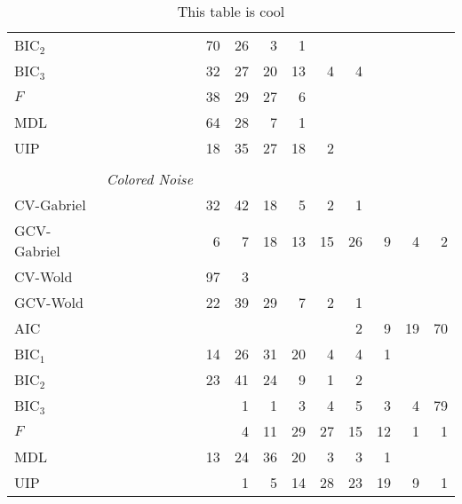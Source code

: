 \begin{table}
\begin{tabular}{lrrrrrrrrrrrrrrrr}
 BIC$_2$ &  &  &  &  &  &  &  &  70 &  26 &  3 &  1 &  &  &  &  & \\ 
 BIC$_3$ &  &  &  &  &  &  &  &  32 &  27 &  20 &  13 &  4 &  4 &  &  & \\ 
 $F$ &  &  &  &  &  &  &  &  38 &  29 &  27 &  6 &  &  &  &  & \\ 
 MDL &  &  &  &  &  &  &  &  64 &  28 &  7 &  1 &  &  &  &  & \\ 
 UIP &  &  &  &  &  &  &  &  18 &  35 &  27 &  18 &  2 &  &  &  & \\ 
        \\
        &\multicolumn{16}{l}{\scriptsize{\textit{Colored Noise}}} \\
CV-Gabriel &  &  &  &  &  &  &  &  32 &  42 &  18 &  5 &  2 &  1 &  &  & \\ 
 GCV-Gabriel &  &  &  &  &  &  &  &  6 &  7 &  18 &  13 &  15 &  26 &  9 &  4 &  2\\ 
 CV-Wold &  &  &  &  &  &  &  &  97 &  3 &  &  &  &  &  &  & \\ 
 GCV-Wold &  &  &  &  &  &  &  &  22 &  39 &  29 &  7 &  2 &  1 &  &  & \\ 
 AIC &  &  &  &  &  &  &  &  &  &  &  &  &  2 &  9 &  19 &  70\\ 
 BIC$_1$ &  &  &  &  &  &  &  &  14 &  26 &  31 &  20 &  4 &  4 &  1 &  & \\ 
 BIC$_2$ &  &  &  &  &  &  &  &  23 &  41 &  24 &  9 &  1 &  2 &  &  & \\ 
 BIC$_3$ &  &  &  &  &  &  &  &  &  1 &  1 &  3 &  4 &  5 &  3 &  4 &  79\\ 
 $F$ &  &  &  &  &  &  &  &  &  4 &  11 &  29 &  27 &  15 &  12 &  1 &  1\\ 
 MDL &  &  &  &  &  &  &  &  13 &  24 &  36 &  20 &  3 &  3 &  1 &  & \\ 
 UIP &  &  &  &  &  &  &  &  &  1 &  5 &  14 &  28 &  23 &  19 &  9 &  1\\ 
        \bottomrule
    \end{tabular}
    \caption{
        This table is cool
    }
\end{table}

